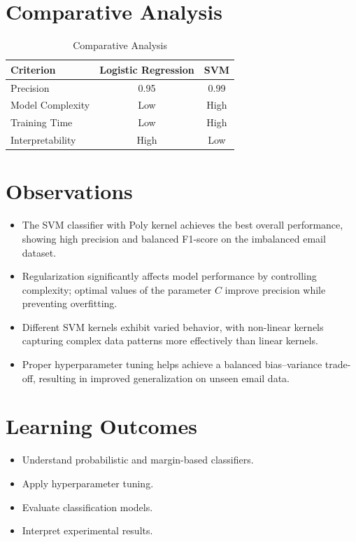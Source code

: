 \documentclass[11pt]{article}
\begin{document}
\section*{Comparative Analysis}
\begin{table}[H]
\centering
\renewcommand{\arraystretch}{1.3}
\caption{Comparative Analysis}
\begin{tabular}{|l|c|c|}
\hline
Criterion & Logistic Regression & SVM \\ \hline
Precision & 0.95 & 0.99 \\
Model Complexity & Low & High \\
Training Time & Low & High \\
Interpretability & High & Low \\ \hline
\end{tabular}
\end{table}

\section{Observations}
\begin{itemize}
    \item The SVM classifier with Poly kernel achieves the best overall performance,
    showing high precision and balanced F1-score on the imbalanced email dataset.

    \item Regularization significantly affects model performance by controlling
    complexity; optimal values of the parameter $C$ improve precision while preventing
    overfitting.

    \item Different SVM kernels exhibit varied behavior, with non-linear kernels
    capturing complex data patterns more effectively than linear kernels.

    \item Proper hyperparameter tuning helps achieve a balanced bias--variance
    trade-off, resulting in improved generalization on unseen email data.
\end{itemize}

\section{Learning Outcomes}
\begin{itemize}
    \item Understand probabilistic and margin-based classifiers.
    \item Apply hyperparameter tuning.
    \item Evaluate classification models.
    \item Interpret experimental results.
\end{itemize}
\end{document}
